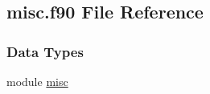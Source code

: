 \hypertarget{misc_8f90}{\subsection{misc.\-f90 File Reference}
\label{misc_8f90}
}
\subsubsection*{Data Types}
\begin{DoxyCompactItemize}
\item 
module \hyperlink{classmisc}{misc}
\end{DoxyCompactItemize}
